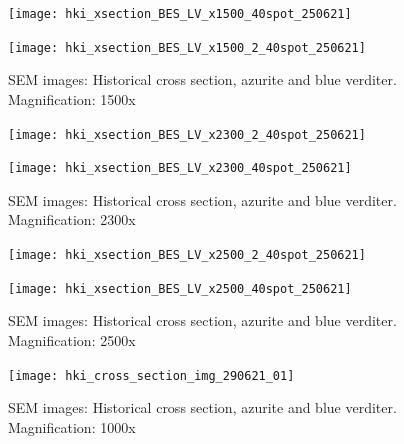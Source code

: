 \begin{figure}[H]
\centering
\begin{minipage}{.45\textwidth}
  \centering
  \texttt{[image: hki\_xsection\_BES\_LV\_x1500\_40spot\_250621]}
\end{minipage}
\begin{minipage}{.45\textwidth}
  \centering
  \texttt{[image: hki\_xsection\_BES\_LV\_x1500\_2\_40spot\_250621]}
\end{minipage}
\caption[SEM images: Historical cross section, azurite and blue verditer]{SEM images: Historical cross section, azurite and blue verditer. Magnification: 1500x}
\label{fig:xsection_jeol_5}
\end{figure}

\begin{figure}[H]
\centering
\begin{minipage}{.45\textwidth}
  \centering
  \texttt{[image: hki\_xsection\_BES\_LV\_x2300\_2\_40spot\_250621]}
\end{minipage}
\begin{minipage}{.45\textwidth}
  \centering
  \texttt{[image: hki\_xsection\_BES\_LV\_x2300\_40spot\_250621]}
\end{minipage}
\caption[SEM images: Historical cross section, azurite and blue verditer]{SEM images: Historical cross section, azurite and blue verditer. Magnification: 2300x}
\label{fig:xsection_jeol_6}
\end{figure}

\begin{figure}[H]
\centering
\begin{minipage}{.45\textwidth}
  \centering
  \texttt{[image: hki\_xsection\_BES\_LV\_x2500\_2\_40spot\_250621]}
\end{minipage}
\begin{minipage}{.45\textwidth}
  \centering
  \texttt{[image: hki\_xsection\_BES\_LV\_x2500\_40spot\_250621]}
\end{minipage}
\caption[SEM images: Historical cross section, azurite and blue verditer]{SEM images: Historical cross section, azurite and blue verditer. Magnification: 2500x}
\label{fig:xsection_jeol_7}
\end{figure}


\begin{figure}[H]
\centering
  \texttt{[image: hki\_cross\_section\_img\_290621\_01]}
\caption[SEM images: Historical cross section, azurite and blue verditer]{SEM images: Historical cross section, azurite and blue verditer. Magnification: 1000x}
\label{fig:xsection_dept_3}
\end{figure}

